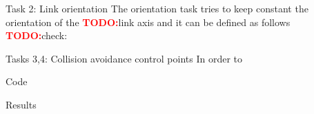 \documentclass[11pt]{beamer}
\newcommand{\todo}{\textcolor{red}{\textbf{TODO:}}}
\begin{document}
\begin{frame}{Task 2: Link orientation}
The orientation task tries to keep constant the orientation of the \todo link axis and it can be defined as follows \todo check:
\end{frame}

\begin{frame}{Tasks 3,4: Collision avoidance control points}
In order to 
\end{frame}

\begin{frame}{Code}

\end{frame}

\begin{frame}{Results}

\end{frame}
\end{document}
